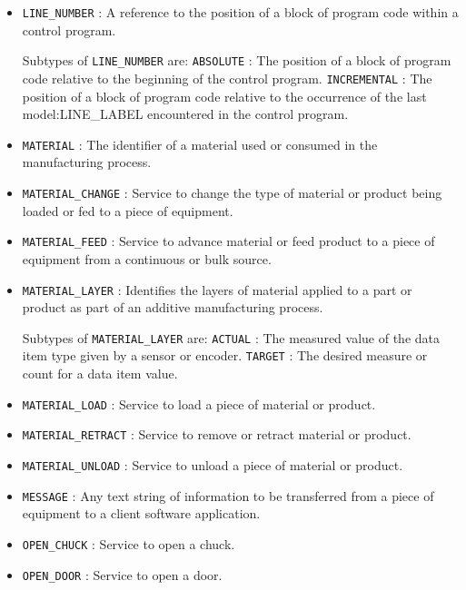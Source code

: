 \begin{itemize}
\item \texttt{LINE_NUMBER} : A reference to the position of a block of program code within a control program. 

Subtypes of \texttt{LINE_NUMBER} are: 
\newline\tab \texttt{ABSOLUTE} : The position of a block of program code relative to the beginning of the control program. 
\newline\tab \texttt{INCREMENTAL} : The position of a block of program code relative to the occurrence of the last {model:LINE_LABEL} encountered in the control program. 
\item \texttt{MATERIAL} : The identifier of a material used or consumed in the manufacturing process. 

\item \texttt{MATERIAL_CHANGE} : Service to change the type of material or product being loaded or fed to a piece of equipment. 

\item \texttt{MATERIAL_FEED} : Service to advance material or feed product to a piece of equipment from a continuous or bulk source. 

\item \texttt{MATERIAL_LAYER} : Identifies the layers of material applied to a part or product as part of an additive manufacturing process. 

Subtypes of \texttt{MATERIAL_LAYER} are: 
\newline\tab \texttt{ACTUAL} : The measured value of the data item type given by a sensor or encoder. 
\newline\tab \texttt{TARGET} : The desired measure or count for a data item value. 
\item \texttt{MATERIAL_LOAD} : Service to load a piece of material or product. 

\item \texttt{MATERIAL_RETRACT} : Service to remove or retract material or product. 

\item \texttt{MATERIAL_UNLOAD} : Service to unload a piece of material or product. 

\item \texttt{MESSAGE} : Any text string of information to be transferred from a piece of equipment to a client software application. 

\item \texttt{OPEN_CHUCK} : Service to open a chuck. 

\item \texttt{OPEN_DOOR} : Service to open a door. 


\end{itemize}
